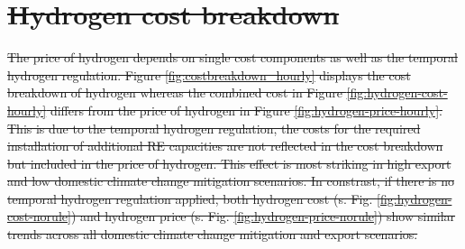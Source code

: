 \documentclass[5p,numafflabel]{elsarticle}
\providecommand{\DIFdeltex}[1]{{\protect\color{red}\sout{#1}}}                      %
\providecommand{\DIFdel}[1]{\texorpdfstring{\DIFdeltex{#1}}{}} %
\begin{document}
\section{\DIFdel{Hydrogen cost breakdown}}
\addtocounter{section}{-1}%

\DIFdel{The price of hydrogen depends on single cost components as well as the temporal hydrogen regulation. Figure \ref{fig:costbreakdown_hourly} displays the cost breakdown of hydrogen 
whereas the combined cost in Figure \ref{fig:hydrogen-cost-hourly} differs from the price of hydrogen in Figure \ref{fig:hydrogen-price-hourly}. This is due to the temporal hydrogen regulation, the costs for the required installation of additional RE capacities are not reflected in the cost breakdown but included in the price of hydrogen. This effect is most striking in high export and low domestic climate change mitigation scenarios. 
In constrast, if there is no temporal hydrogen regulation applied, both hydrogen cost (s. Fig. \ref{fig:hydrogen-cost-norule}) and hydrogen price (s. Fig. \ref{fig:hydrogen-price-norule}) show similar trends across all domestic climate change mitigation and export scenarios.
}%
\end{document}
